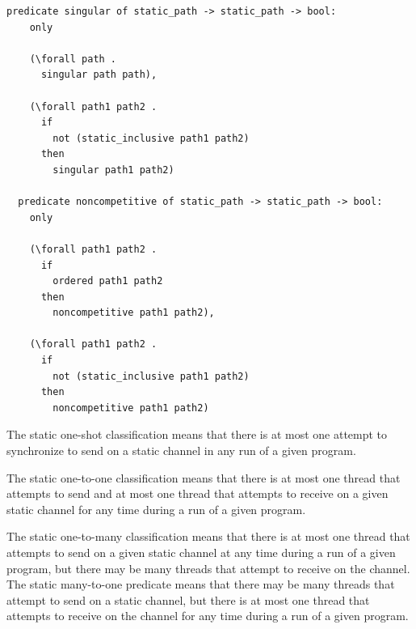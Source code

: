 \documentclass[10pt]{article}
\begin{document}
\begin{lstlisting}[language=logic, mathescape]
  predicate singular of static_path -> static_path -> bool:
    only

    (\forall path .
      singular path path),

    (\forall path1 path2 .
      if
        not (static_inclusive path1 path2)
      then
        singular path1 path2)

  predicate noncompetitive of static_path -> static_path -> bool:
    only

    (\forall path1 path2 .
      if
        ordered path1 path2
      then
        noncompetitive path1 path2),

    (\forall path1 path2 .
      if
        not (static_inclusive path1 path2)
      then
        noncompetitive path1 path2)
\end{lstlisting}


The static one-shot classification means that there is at most one attempt
to synchronize to send on a static channel in any run of a given program.

The static one-to-one classification means that there is at most one thread that attempts to
send and at most one thread that attempts to receive on a given static channel for any time
during a run of a given program.

The static one-to-many classification means that there is at most one thread that attempts to
send on a given static channel at any time during a run of a given program, but there may be
many threads that attempt to receive on the channel. The static many-to-one predicate means
that there may be many threads that attempt to send on a static channel, but there is at most
one thread that attempts to receive on the channel for any time during a run of a given
program.
\end{document}
